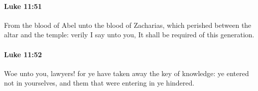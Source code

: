 		\paragraph{Luke 11:51} %
			\label{LUKE-11-51}

			From the blood of Abel unto the blood of Zacharias, which perished between the altar and the temple: verily I say unto you, It shall be required of this generation.

			\begin{framed}
			\scriptsize
				\begin{compactdesc}
					\item[SBLG] 
				\end{compactdesc}
			\end{framed}

		\paragraph{Luke 11:52} %
			\label{LUKE-11-52}

			Woe unto you, lawyers! for ye have taken away the key of knowledge: ye entered not in yourselves, and them that were entering in ye hindered.

